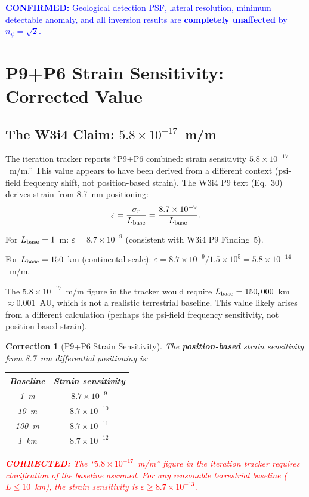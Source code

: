 \documentclass[aps,prd,twocolumn,superscriptaddress,nofootinbib]{revtex4-2}
\newcommand{\confirmed}[1]{\textcolor{blue}{\textbf{CONFIRMED:} #1}}
\newcommand{\corrected}[1]{\textcolor{red}{\textbf{CORRECTED:} #1}}
\newtheorem{correction}{Correction}
\begin{document}
\confirmed{Geological detection PSF, lateral resolution, minimum
detectable anomaly, and all inversion results are \textbf{completely
unaffected} by $n_\psi = \sqrt{2}$.}

\section{P9+P6 Strain Sensitivity: Corrected Value}
\label{sec:strain}

\subsection{The W3i4 Claim: $5.8\times10^{-17}$~m/m}

The iteration tracker reports ``P9+P6 combined: strain sensitivity
$5.8\times10^{-17}$~m/m.'' This value appears to have been derived
from a different context (psi-field frequency shift, not position-based
strain). The W3i4 P9 text (Eq.~30) derives strain from 8.7~nm
positioning:
\begin{equation}
\varepsilon = \frac{\sigma_r}{L_{\rm base}} = \frac{8.7\times10^{-9}}{L_{\rm base}}.
\end{equation}

For $L_{\rm base} = 1$~m: $\varepsilon = 8.7\times10^{-9}$ (consistent
with W3i4 P9 Finding~5).

For $L_{\rm base} = 150$~km (continental scale):
$\varepsilon = 8.7\times10^{-9}/1.5\times10^5 = 5.8\times10^{-14}$~m/m.

The $5.8\times10^{-17}$~m/m figure in the tracker would require
$L_{\rm base} = 150,000$~km $\approx 0.001$~AU, which is not a
realistic terrestrial baseline. This value likely arises from a
different calculation (perhaps the psi-field frequency sensitivity,
not position-based strain).

\begin{correction}[P9+P6 Strain Sensitivity]
\label{corr:strain}
The \textbf{position-based} strain sensitivity from 8.7~nm differential
positioning is:
\begin{center}
\begin{tabular}{cc}
\toprule
Baseline & Strain sensitivity \\
\midrule
1~m & $8.7\times10^{-9}$ \\
10~m & $8.7\times10^{-10}$ \\
100~m & $8.7\times10^{-11}$ \\
1~km & $8.7\times10^{-12}$ \\
\bottomrule
\end{tabular}
\end{center}
\corrected{The ``$5.8\times10^{-17}$~m/m'' figure in the iteration
tracker requires clarification of the baseline assumed. For any
reasonable terrestrial baseline ($L \leq 10$~km), the strain
sensitivity is $\varepsilon \geq 8.7\times10^{-13}$.}
\end{correction}
\end{document}
